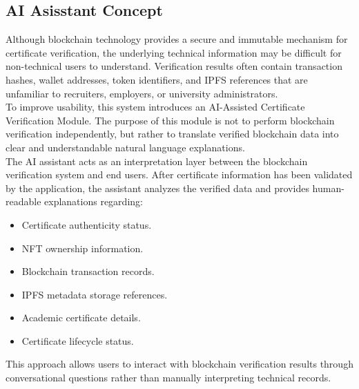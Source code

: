 \subsection{AI Asisstant Concept}

    Although blockchain technology provides a secure and immutable mechanism for certificate verification, the underlying technical information may be difficult for non-technical users to understand. Verification results often contain transaction hashes, wallet addresses, token identifiers, and IPFS references that are unfamiliar to recruiters, employers, or university administrators.\\

    To improve usability, this system introduces an AI-Assisted Certificate Verification Module. The purpose of this module is not to perform blockchain verification independently, but rather to translate verified blockchain data into clear and understandable natural language explanations.\\

    The AI assistant acts as an interpretation layer between the blockchain verification system and end users. After certificate information has been validated by the application, the assistant analyzes the verified data and provides human-readable explanations regarding:

    \begin{itemize}
        \item Certificate authenticity status.
        \item NFT ownership information.
        \item Blockchain transaction records.
        \item IPFS metadata storage references.
        \item Academic certificate details.
        \item Certificate lifecycle status.
    \end{itemize}

    This approach allows users to interact with blockchain verification results through conversational questions rather than manually interpreting technical records.
